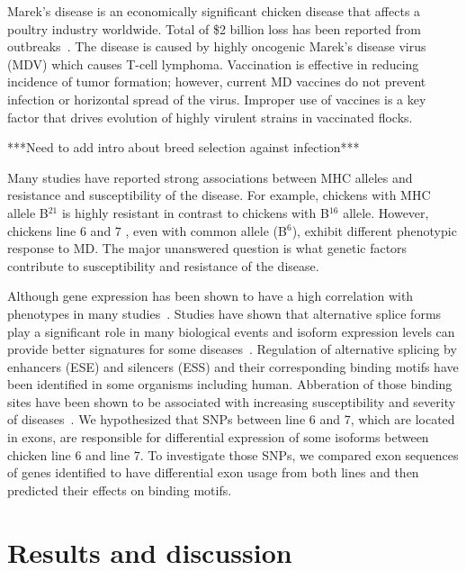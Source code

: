 \documentclass[10pt]{article}
\begin{document}
Marek's disease is an economically significant chicken disease that affects a poultry industry worldwide.
Total of \$2 billion loss has been reported from outbreaks~\cite{}.
The disease is caused by highly oncogenic Marek's disease virus (MDV) which causes T-cell lymphoma.
Vaccination is effective in reducing incidence of tumor formation; however, current MD vaccines do not
prevent infection or horizontal spread of the virus.
Improper use of vaccines is a key factor that drives evolution of highly virulent strains in vaccinated
flocks.

***Need to add intro about breed selection against infection***

Many studies have reported strong associations between MHC alleles and resistance and susceptibility of
the disease. For example, chickens with MHC allele B$^{21}$ is highly resistant in contrast to chickens with
B$^{16}$ allele.
However, chickens line 6 and 7 , even with common allele (B$^6$), exhibit different phenotypic response to
MD.
The major unanswered question is what genetic factors contribute to susceptibility and resistance of
the disease.

Although gene expression has been shown to have a high correlation with phenotypes in many studies~\cite{}.
Studies have shown that alternative splice forms play a significant role in many biological events and
isoform expression levels can provide better signatures for some diseases~\cite{zhang2013isoform}.
Regulation of alternative splicing by enhancers (ESE) and silencers (ESS) and their corresponding
binding motifs have been identified in some organisms including human.
Abberation of those binding sites have been shown to be associated with increasing susceptibility and severity of diseases~\cite{}.
We hypothesized that SNPs between line 6 and 7, which are located in exons, are responsible for differential
expression of some isoforms between chicken line 6 and line 7.
To investigate those SNPs, we compared exon sequences of genes identified to have differential exon usage
from both lines and then predicted their effects on binding motifs.


\section*{Results and discussion}
\end{document}
